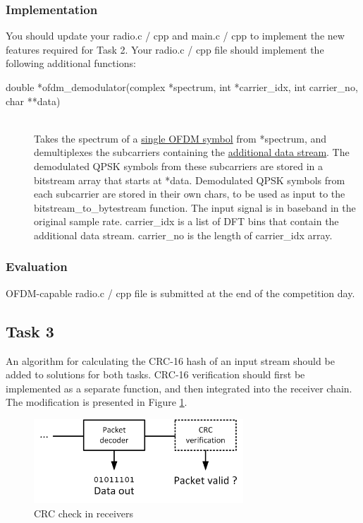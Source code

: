 \documentclass{article}
\begin{document}
\subsubsection{Implementation}
You should update your \textsf{radio.c / cpp} and \textsf{main.c / cpp} to implement the new features required for Task 2. Your \textsf{radio.c / cpp} file should implement the following additional functions:
\begin{description}
	\item[double *ofdm\_demodulator(complex *spectrum, int *carrier\_idx, int carrier\_no, char **data)]
	\,\\ Takes the spectrum of a \underline{single OFDM symbol} from \textsf{*spectrum}, and demultiplexes the subcarriers containing the \underline{additional data stream}. The demodulated QPSK symbols from these subcarriers are stored in a bitstream array that starts at \textsf{*data}. Demodulated QPSK symbols from each subcarrier are stored in their own \textsf{char}s, to be used as input to the \textsf{bitstream\_to\_bytestream} function. The input signal is in baseband in the original sample rate. \textsf{carrier\_idx} is a list of DFT bins that contain the additional data stream. \textsf{carrier\_no} is the length of \textsf{carrier\_idx} array.
\end{description}

\subsubsection{Evaluation}

OFDM-capable \textsf{radio.c / cpp} file is submitted at the end of the competition day.

\subsection{Task 3}
An algorithm for calculating the CRC-16 hash of an input stream should be added to solutions for both tasks. CRC-16 verification should first be implemented as a separate function, and then integrated into the receiver chain. The modification is presented in Figure \ref{fig:task3}.

\begin{figure}[h!]
\centering
\includegraphics[width=0.7\textwidth]{Images/Task3.png}
\caption{CRC check in receivers}
\label{fig:task3}
\end{figure}
\end{document}
